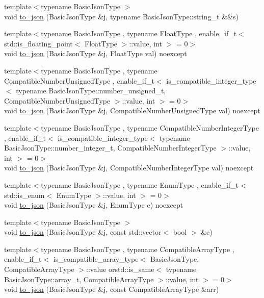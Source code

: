\begin{DoxyCompactItemize}
\item 
{\footnotesize template$<$typename Basic\+Json\+Type $>$ }\\void \hyperlink{namespacenlohmann_1_1detail_a4aa1ca6b7c61bf19d1f30ea5b669f68e}{to\+\_\+json} (Basic\+Json\+Type \&j, typename Basic\+Json\+Type\+::string\+\_\+t \&\&s)
\item 
{\footnotesize template$<$typename Basic\+Json\+Type , typename Float\+Type , enable\+\_\+if\+\_\+t$<$ std\+::is\+\_\+floating\+\_\+point$<$ Float\+Type $>$\+::value, int $>$  = 0$>$ }\\void \hyperlink{namespacenlohmann_1_1detail_a22bffdc8bc7e43af380ba2050696b230}{to\+\_\+json} (Basic\+Json\+Type \&j, Float\+Type val) noexcept
\item 
{\footnotesize template$<$typename Basic\+Json\+Type , typename Compatible\+Number\+Unsigned\+Type , enable\+\_\+if\+\_\+t$<$ is\+\_\+compatible\+\_\+integer\+\_\+type$<$ typename Basic\+Json\+Type\+::number\+\_\+unsigned\+\_\+t, Compatible\+Number\+Unsigned\+Type $>$\+::value, int $>$  = 0$>$ }\\void \hyperlink{namespacenlohmann_1_1detail_ae5fd66b5517b3b5a6c6b9fd9f29ba8dc}{to\+\_\+json} (Basic\+Json\+Type \&j, Compatible\+Number\+Unsigned\+Type val) noexcept
\item 
{\footnotesize template$<$typename Basic\+Json\+Type , typename Compatible\+Number\+Integer\+Type , enable\+\_\+if\+\_\+t$<$ is\+\_\+compatible\+\_\+integer\+\_\+type$<$ typename Basic\+Json\+Type\+::number\+\_\+integer\+\_\+t, Compatible\+Number\+Integer\+Type $>$\+::value, int $>$  = 0$>$ }\\void \hyperlink{namespacenlohmann_1_1detail_a91fe576be579c8c2fdd14610605c6dd2}{to\+\_\+json} (Basic\+Json\+Type \&j, Compatible\+Number\+Integer\+Type val) noexcept
\item 
{\footnotesize template$<$typename Basic\+Json\+Type , typename Enum\+Type , enable\+\_\+if\+\_\+t$<$ std\+::is\+\_\+enum$<$ Enum\+Type $>$\+::value, int $>$  = 0$>$ }\\void \hyperlink{namespacenlohmann_1_1detail_a0c8b159dba71981d6c555d284cf6e2bf}{to\+\_\+json} (Basic\+Json\+Type \&j, Enum\+Type e) noexcept
\item 
{\footnotesize template$<$typename Basic\+Json\+Type $>$ }\\void \hyperlink{namespacenlohmann_1_1detail_aeca6fb5fede5ed1e12a4420d98a5692b}{to\+\_\+json} (Basic\+Json\+Type \&j, const std\+::vector$<$ bool $>$ \&e)
\item 
{\footnotesize template$<$typename Basic\+Json\+Type , typename Compatible\+Array\+Type , enable\+\_\+if\+\_\+t$<$ is\+\_\+compatible\+\_\+array\+\_\+type$<$ Basic\+Json\+Type, Compatible\+Array\+Type $>$\+::value orstd\+::is\+\_\+same$<$ typename Basic\+Json\+Type\+::array\+\_\+t, Compatible\+Array\+Type $>$\+::value, int $>$  = 0$>$ }\\void \hyperlink{namespacenlohmann_1_1detail_a3afebc132c5ff83f9cd160e52030fdfd}{to\+\_\+json} (Basic\+Json\+Type \&j, const Compatible\+Array\+Type \&arr)

\end{DoxyCompactItemize}
